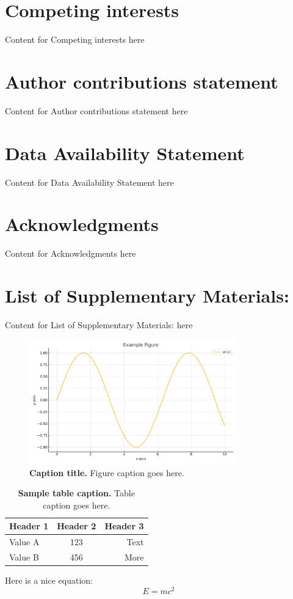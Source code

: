 \documentclass[10pt,letterpaper]{article}
\begin{document}
\section*{Competing interests}
Content for Competing interests here

\section*{Author contributions statement}
Content for Author contributions statement here

\section*{Data Availability Statement}
Content for Data Availability Statement here

\section*{Acknowledgments}
Content for Acknowledgments here

\section*{List of Supplementary Materials:}
Content for List of Supplementary Materials: here

\begin{figure}[ht!]
    \centering
    \includegraphics[width=0.8\textwidth]{example-figure.png}
    \caption{\textbf{Caption title.} Figure caption goes here.}
    \label{fig:example}
\end{figure}

\begin{table}[ht!]
    \centering
    \caption{\textbf{Sample table caption.} Table caption goes here.}
    \label{tab:sample}
    \begin{tabular}{|l|c|r|}
    \hline
    Header 1 & Header 2 & Header 3 \\
    \hline
    Value A & 123       & Text     \\
    Value B & 456       & More     \\
    \hline
    \end{tabular}
\end{table}

Here is a nice equation:
\begin{equation}
    E = mc^2
    \label{eq:einstein}
\end{equation}



\end{document}
